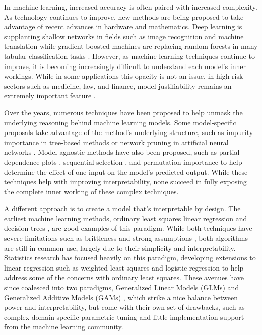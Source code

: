 In machine learning, increased accuracy is often paired with increased complexity. As technology continues to improve, new methods are being proposed to take advantage of recent advances in hardware and mathematics. Deep learning is supplanting shallow networks in fields such as image recognition \citep{Szegedy2015GoingConvolutions} and machine translation \citep{Bahdanau2014NeuralTranslate} while gradient boosted machines are replacing random forests in many tabular classification tasks \citep{Friedman2001GreedyMachine}. However, as machine learning techniques continue to improve, it is becoming increasingly difficult to understand each model’s inner workings. While in some applications this opacity is not an issue, in high-risk sectors such as medicine, law, and finance, model justifiability remains an extremely important feature \citep{Hastie2009TheLearning}.

Over the years, numerous techniques have been proposed to help unmask the underlying reasoning behind machine learning models. Some model-specific proposals take advantage of the method’s underlying structure, such as impurity importance in tree-based methods \citep{Louppe2013UnderstandingTrees} or network pruning in artificial neural networks \citep{Kingston2004AModelling}. Model-agnostic methods have also been proposed, such as partial dependence plots \citep{Friedman2001GreedyMachine}, sequential selection \citep{Zou2005RegularizationNet}, and permutation importance \citep{Breiman1984ClassificationTrees} to help determine the effect of one input on the model’s predicted output. While these techniques help with improving interpretability, none succeed in fully exposing the complete inner working of these complex techniques. 

A different approach is to create a model that’s interpretable by design. The earliest machine learning methods, ordinary least squares linear regression \citep{Galton1886RegressionStature.} and decision trees \citep{Belson1959MatchingClassification}, are good examples of this paradigm. While both techniques have severe limitations such as brittleness \citep{Norton1989GeneratingTrees} and strong assumptions \citep{Hayashi2000Econometrics}, both algorithms are still in common use, largely due to their simplicity and interpretability.  Statistics research has focused heavily on this paradigm, developing extensions to linear regression such as weighted least squares \citep{Suarez2017WeightedRegression} and logistic regression \citep{Nelder1972GeneralizedModels} to help address some of the concerns with ordinary least squares. These avenues have since coalesced into two paradigms, Generalized Linear Models (GLMs) \citep{Nelder1972GeneralizedModels} and Generalized Additive Models (GAMs) \citep{Hastie2007GeneralizedModels}, which strike a nice balance between power and interpretability, but come with their own set of drawbacks, such as complex domain-specific parametric tuning and little implementation support from the machine learning community.

